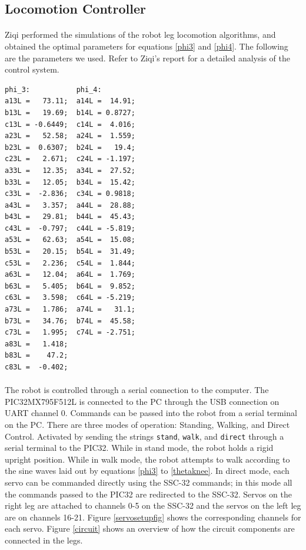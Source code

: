 \documentclass[titlepage,letterpaper,12pt]{article}
\begin{document}
\subsection{Locomotion Controller}
\paragraph{}Ziqi performed the simulations of the robot leg locomotion
algorithms, and obtained the optimal parameters for equations \ref{phi3} and
\ref{phi4}. The following are the parameters we used. Refer to Ziqi's report for
a detailed analysis of the control system.
\begin{verbatim}
phi_3:           phi_4:
a13L =   73.11;  a14L =  14.91;
b13L =   19.69;  b14L = 0.8727;
c13L = -0.6449;  c14L =  4.016;
a23L =   52.58;  a24L =  1.559;
b23L =  0.6307;  b24L =   19.4;
c23L =   2.671;  c24L = -1.197;
a33L =   12.35;  a34L =  27.52;
b33L =   12.05;  b34L =  15.42;
c33L =  -2.836;  c34L = 0.9818;
a43L =   3.357;  a44L =  28.88;
b43L =   29.81;  b44L =  45.43;
c43L =  -0.797;  c44L = -5.819;
a53L =   62.63;  a54L =  15.08;
b53L =   20.15;  b54L =  31.49;
c53L =   2.236;  c54L =  1.844;
a63L =   12.04;  a64L =  1.769;
b63L =   5.405;  b64L =  9.852;
c63L =   3.598;  c64L = -5.219;
a73L =   1.786;  a74L =   31.1;
b73L =   34.76;  b74L =  45.58;
c73L =   1.995;  c74L = -2.751;
a83L =   1.418;
b83L =    47.2;
c83L =  -0.402;
\end{verbatim}

\paragraph{}The robot is controlled through a serial connection to the computer.
The PIC32MX795F512L is connected to the PC through the USB connection on UART
channel 0. Commands can be passed into the robot from a serial terminal on the
PC. There are three modes of operation: Standing, Walking, and Direct
Control. Activated by sending the strings \verb!stand!, \verb!walk!, and
\verb!direct! through a serial terminal to the PIC32. While in stand mode, the
robot holds a rigid upright position. While in walk mode, the robot attempts to
walk according to the sine waves laid out by equations \ref{phi3} to
\ref{thetaknee}. In direct mode, each servo can be commanded directly using
the SSC-32 commands; in this mode all the commands passed to the PIC32 are
redirected to the SSC-32. Servos on the right leg are attached to channels 0-5
on the SSC-32 and the servos on the left leg are on channels 16-21. Figure
\ref{servosetupfig} shows the corresponding channels for each servo. Figure
\ref{circuit} shows an overview of how the circuit components are connected in
the legs.
\end{document}
